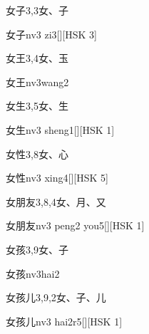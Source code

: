 \begin{Entry}{女子}{3,3}{⼥、⼦}
  \begin{Phonetics}{女子}{nv3 zi3}[][HSK 3]
  \end{Phonetics}
\end{Entry}

\begin{Entry}{女王}{3,4}{⼥、⽟}
  \begin{Phonetics}{女王}{nv3wang2}
  \end{Phonetics}
\end{Entry}

\begin{Entry}{女生}{3,5}{⼥、⽣}
  \begin{Phonetics}{女生}{nv3 sheng1}[][HSK 1]
  \end{Phonetics}
\end{Entry}

\begin{Entry}{女性}{3,8}{⼥、⼼}
  \begin{Phonetics}{女性}{nv3 xing4}[][HSK 5]
  \end{Phonetics}
\end{Entry}

\begin{Entry}{女朋友}{3,8,4}{⼥、⽉、⼜}
  \begin{Phonetics}{女朋友}{nv3 peng2 you5}[][HSK 1]
  \end{Phonetics}
\end{Entry}

\begin{Entry}{女孩}{3,9}{⼥、⼦}
  \begin{Phonetics}{女孩}{nv3hai2}
  \end{Phonetics}
\end{Entry}

\begin{Entry}{女孩儿}{3,9,2}{⼥、⼦、⼉}
  \begin{Phonetics}{女孩儿}{nv3 hai2r5}[][HSK 1]
  \end{Phonetics}
\end{Entry}

